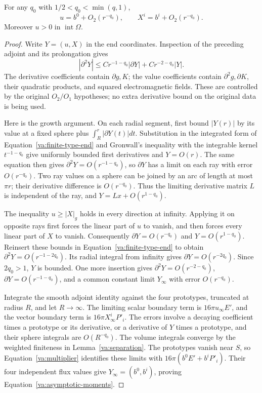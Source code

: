 \begin{lemma}\label{va:normalization}
For any \(q_0\) with \(1/2<q_0<\min(q,1)\),
\begin{equation}\label{va:asymptotic-moments}
 u=b^0+O_2(r^{-q_0}),\qquad
 X^i=b^i+O_2(r^{-q_0}).
\end{equation}
Moreover \(u>0\) in \(\operatorname{int}\Omega\).
\end{lemma}
\begin{proof}
Write \(Y=(u,X)\) in the end coordinates.  Inspection of the preceding
adjoint and its prolongation gives
\begin{equation}\label{va:finite-type-end}
 |\partial^2Y|\le C r^{-1-q_0}|\partial Y|
                         +C r^{-2-q_0}|Y|.
\end{equation}
The derivative coefficients contain \(\partial g,K\); the value
coefficients contain \(\partial^2g,\partial K\), their quadratic
products, and squared electromagnetic fields.  These are controlled by
the original \(O_2/O_1\) hypotheses; no extra derivative bound on the
original data is being used.

Here is the growth argument.  On each radial segment, first bound
\(|Y(r)|\) by its value at a fixed sphere plus
\(\int_R^r|\partial Y(t)|dt\).  Substitution in the integrated form
of Equation~\eqref{va:finite-type-end} and Gronwall's inequality with
the integrable kernel \(t^{-1-q_0}\) give uniformly bounded first
derivatives and \(Y=O(r)\).  The same equation then gives
\(\partial^2Y=O(r^{-1-q_0})\), so \(\partial Y\) has a limit on
each ray with error \(O(r^{-q_0})\).  Two ray values on a sphere can
be joined by an arc of length at most \(\pi r\); their derivative
difference is \(O(r^{-q_0})\).  Thus the limiting derivative matrix
\(L\) is independent of the ray, and
\(Y=Lx+O(r^{1-q_0})\).

The inequality \(u\ge|X|_g\) holds in every direction at infinity.
Applying it on opposite rays first forces the linear part of \(u\)
to vanish, and then forces every linear part of \(X\) to vanish.
Consequently \(\partial Y=O(r^{-q_0})\) and
\(Y=O(r^{1-q_0})\).  Reinsert these bounds in
Equation~\eqref{va:finite-type-end} to obtain
\(\partial^2Y=O(r^{-1-2q_0})\).  Its radial integral from infinity
gives \(\partial Y=O(r^{-2q_0})\).  Since \(2q_0>1\), \(Y\) is
bounded.  One more insertion gives
\(\partial^2Y=O(r^{-2-q_0})\),
\(\partial Y=O(r^{-1-q_0})\), and a common constant limit
\(Y_\infty\) with error \(O(r^{-q_0})\).

Integrate the smooth adjoint identity against the four prototypes,
truncated at radius \(R\), and let \(R\to\infty\).  The limiting
scalar boundary term is \(16\pi u_\infty E'\), and the vector
boundary term is \(16\pi X_\infty^iP'_i\).  The errors involve a
decaying coefficient times a prototype or its derivative, or a
derivative of \(Y\) times a prototype, and their sphere integrals
are \(O(R^{-q_0})\).  The volume integrals converge by the weighted
finiteness in Lemma~\ref{va:separation}.  The prototypes vanish near
\(S\), so Equation~\eqref{va:multiplier} identifies these limits with
\(16\pi(b^0E'+b^iP'_i)\).  Their four independent flux values give
\(Y_\infty=(b^0,b^i)\), proving
Equation~\eqref{va:asymptotic-moments}.


\end{proof}
